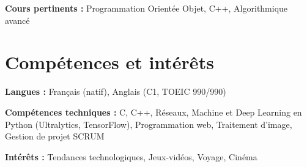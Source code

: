         \begin{onecolentry}
            \begin{highlights}
                \item \textbf{Cours pertinents :} Programmation Orientée Objet, C++, Algorithmique avancé
            \end{highlights}
        \end{onecolentry}


    \section{Compétences et intérêts}
        \begin{onecolentry}
            \textbf{Langues :} Français (natif), Anglais (C1, TOEIC 990/990) 
        \end{onecolentry}

        \begin{onecolentry}
            \textbf{Compétences techniques :} C, C++, Réseaux, Machine et Deep Learning en Python (Ultralytics, TensorFlow), Programmation web, Traitement d'image, Gestion de projet SCRUM
        \end{onecolentry}

        \begin{onecolentry}
            \textbf{Intérêts :} Tendances technologiques, Jeux-vidéos, Voyage, Cinéma
        \end{onecolentry}